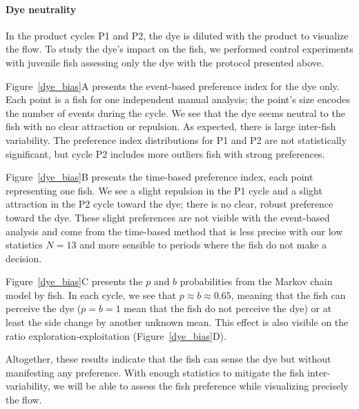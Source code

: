   \paragraph{Dye neutrality} In the product cycles P1 and P2, the dye is diluted with the product to visualize the flow. To study the dye's impact on the fish, we performed control experiments with juvenile fish assessing only the dye with the protocol presented above.

  Figure~\ref{dye_bias}A presents the event-based preference index for the dye only. Each point is a fish for one independent manual analysis; the point's size encodes the number of events during the cycle. We see that the dye seems neutral to the fish with no clear attraction or repulsion. As expected, there is large inter-fish variability. The preference index distributions for P1 and P2 are not statistically significant, but cycle P2 includes more outliers fish with strong preferences.

  Figure~\ref{dye_bias}B presents the time-based preference index, each point representing one fish. We see a slight repulsion in the P1 cycle and a slight attraction in the P2 cycle toward the dye; there is no clear, robust preference toward the dye. These slight preferences are not visible with the event-based analysis and come from the time-based method that is less precise with our low statistics $N=13$ and more sensible to periods where the fish do not make a decision.

  Figure~\ref{dye_bias}C presents the $p$ and $b$ probabilities from the Markov chain model by fish. In each cycle, we see that $p \approx b \approx 0.65$, meaning that the fish can perceive the dye ($ p = b = 1$ mean that the fish do not perceive the dye) or at least the side change by another unknown mean. This effect is also visible on the ratio exploration-exploitation (Figure~\ref{dye_bias}D).

  Altogether, these results indicate that the fish can sense the dye but without manifesting any preference. With enough statistics to mitigate the fish inter-variability, we will be able to assess the fish preference while visualizing precisely the flow.

